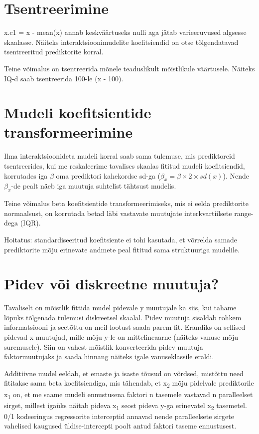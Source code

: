 \documentclass[]{book}
\begin{document}
\section{Tsentreerimine}\label{tsentreerimine}

x.c1 = x - mean(x) annab keskväärtuseks nulli aga jätab varieeruvused
algsesse skaalasse. Näiteks interaktsioonimudelite koefitsiendid on otse
tõlgendatavad tsentreeritud prediktorite korral.

Teine võimalus on tsentreerida mõnele teaduslikult mõistlikule
väärtusele. Näiteks IQ-d saab tsentreerida 100-le (x - 100).

\section{Mudeli koefitsientide
transformeerimine}\label{mudeli-koefitsientide-transformeerimine}

Ilma interaktsioonideta mudeli korral saab sama tulemuse, mis
prediktoreid tsentreerides, kui me reskaleerime tavalises skaalas
fititud mudeli koefitsiendid, korrutades iga \(\beta\) oma prediktori
kahekordse sd-ga (\(\beta_x = \beta \times 2 \times sd(x)\)). Nende
\(\beta_x\)-de pealt näeb iga muutuja suhtelist tähtsust mudelis.

Teine võimalus beta koefitsientide transformeerimiseks, mis ei eelda
prediktorite normaalsust, on korrutada betad läbi vastavate muutujate
interkvartiilsete range-dega (IQR).

Hoitatus: standardiseeritud koefitsiente ei tohi kasutada, et võrrelda
samade prediktorite mõju erinevate andmete peal fititud sama
struktuuriga mudelile.

\section{Pidev või diskreetne
muutuja?}\label{pidev-voi-diskreetne-muutuja}

Tavaliselt on mõistlik fittida mudel pidevale y muutujale ka siis, kui
tahame lõpuks tõlgenada tulemusi diskreetsel skaalal. Pidev muutuja
sisaldab rohkem informatsiooni ja seetõttu on meil lootust saada parem
fit. Erandiks on sellised pidevad x muutujad, mille mõju y-le on
mittelineaarne (näiteks vanuse mõju suremusele). Siin on vahest mõistlik
konverteerida pidev muutuja faktormuutujaks ja saada hinnang näiteks
igale vanuseklassile eraldi.

Additiivne mudel eeldab, et emaste ja isaste tõusud on võrdsed, mistõttu
need fititakse sama beta koefitsiendiga, mis tähendab, et
x\textsubscript{2} mõju pidelvale prediktorile x\textsubscript{1} on, et
me saame mudeli ennustusena faktori n tasemele vastavad n paralleelset
sirget, millest igaüks näitab pideva x\textsubscript{1} seost pideva
y-ga erinevatel x\textsubscript{2} tasemetel. 0/1 kodeeringus
regressorite interceptid annavad nende paralleelsete sirgete vahelised
kaugused üldise-intercepti poolt antud faktori taseme ennustusest.
\end{document}
